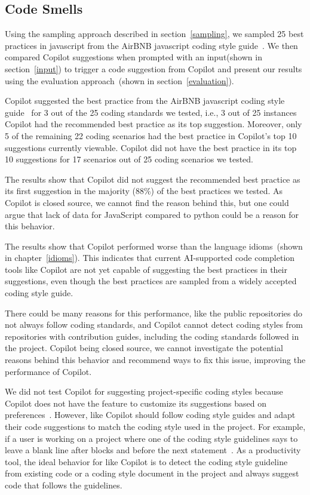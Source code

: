 \subsection{Code Smells}
\label{smells:results}
Using the sampling approach described in section~\ref{sampling}, we sampled 25 best practices in javascript from the AirBNB javascript coding style guide~\cite{airbnb_code}. 
We then compared Copilot suggestions when prompted with an input(shown in section~\ref{input}) to trigger a code suggestion from Copilot and present our results using the evaluation approach~(shown in section~\ref{evaluation}).

Copilot suggested the best practice from the AirBNB javascript coding style guide~\cite{airbnb_code} for 3 out of the 25 coding standards we tested, i.e., 3 out of 25 instances Copilot had the recommended best practice as its top suggestion.
Moreover, only 5 of the remaining 22 coding scenarios had the best practice in Copilot's top 10 suggestions currently viewable. 
Copilot did not have the best practice in its top 10 suggestions for 17 scenarios out of 25 coding scenarios we tested.

The results show that Copilot did not suggest the recommended best practice as its first suggestion in the majority (88\%) of the best practices we tested.
As Copilot is closed source, we cannot find the reason behind this, but one could argue that lack of data for JavaScript compared to python could be a reason for this behavior. 

The results show that Copilot performed worse than the language idioms~(shown in chapter~\ref{idioms}). This indicates that current AI-supported
code completion tools like Copilot are not yet capable of suggesting the best practices in their suggestions, even though the best practices are sampled from a widely accepted coding style guide.

There could be many reasons for this performance, like the public repositories do not always follow coding standards, and Copilot cannot detect coding styles from repositories with contribution guides, including the coding standards followed in the project. 
Copilot being closed source, we cannot investigate the potential reasons behind this behavior and recommend ways to fix this issue, improving the performance of Copilot.

We did not test Copilot for suggesting project-specific coding styles because Copilot does not have the feature to customize its suggestions based on preferences~\cite{Copilot-web}.
However, \cct{} like Copilot should follow coding style guides and adapt their code suggestions to match the coding style used in the project. 
For example, if a user is working on a project where one of the coding style guidelines says to leave a blank line after blocks and before the next statement~\cite{airbnb_code}. As a productivity tool, the ideal behavior for \cct{} like Copilot is to detect the coding style guideline from existing code or a coding style document in the project and always suggest code that follows the guidelines.

